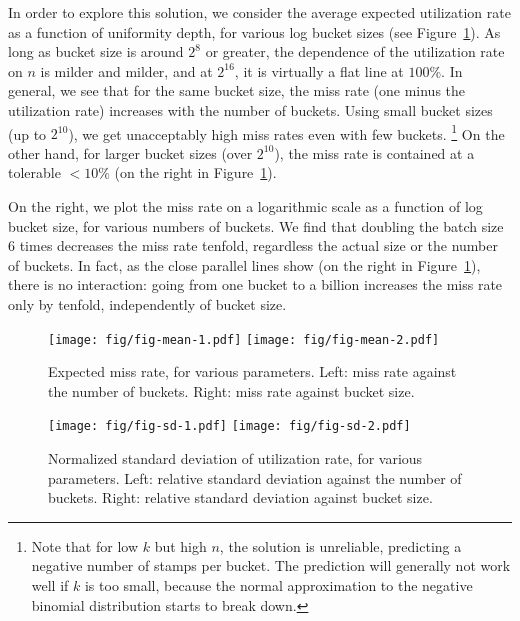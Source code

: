 In order to explore this solution, we consider the average expected
utilization rate as a function of uniformity depth, for various log bucket
sizes (see Figure~\ref{fig-mean}). As long as bucket size is around $2^8$ or greater,
the dependence of the utilization rate on $n$ is milder and milder, and at $2^{16}$, it is virtually a flat line at $100\%$.
In general, we see that for the same bucket size, the miss rate
(one minus the utilization rate) increases with the number of buckets. Using
small bucket sizes (up to $2^{10}$), we get unacceptably high miss
rates even with few buckets.%
%
\footnote{Note that for low $k$ but high
  $n$, the solution is unreliable, predicting a negative number of
  stamps per bucket. The prediction will generally not work well if
  $k$ is too small, because the normal approximation to the negative
  binomial distribution starts to break down.}
%  
On the other hand, for
larger bucket sizes (over $2^{10}$), the miss rate is contained at a
tolerable $<10\%$ (on the right in Figure~\ref{fig-mean}).

On the right, we plot the miss rate on a logarithmic scale as a function of log bucket size, for various numbers of buckets. We
find that doubling the batch size 6 times decreases the miss rate
tenfold, regardless the actual size or the number of buckets. In fact,
as the close parallel lines show (on the right in Figure~\ref{fig-mean}), there is no interaction:
going from one bucket to a billion increases the miss rate
only by tenfold, independently of bucket size.


\begin{figure}[!ht]
  \centering
  \texttt{[image: fig/fig-mean-1.pdf]} \texttt{[image: fig/fig-mean-2.pdf]}
  \caption[Expected miss rate, for various parameters.]{\label{fig-mean}Expected miss rate, for various parameters. Left: miss rate against the number of buckets. Right: miss rate against bucket size.}
\end{figure}


\begin{figure}[!ht]
  \centering
  \texttt{[image: fig/fig-sd-1.pdf]} \texttt{[image: fig/fig-sd-2.pdf]}
  \caption[Normalized standard deviation of utilization rate]{\label{fig-sd}Normalized standard deviation of utilization rate, for various parameters. Left: relative standard deviation against the number of buckets. Right: relative standard deviation against bucket size.}
\end{figure}





